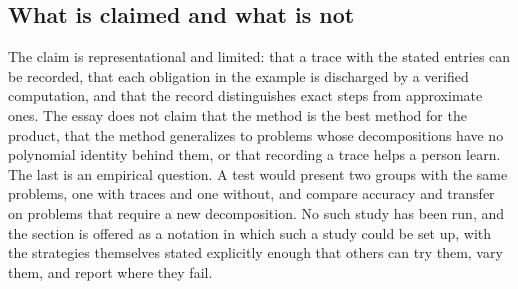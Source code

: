 \subsection{What is claimed and what is not}

The claim is representational and limited: that a trace with the stated entries can be recorded, that each obligation in the example is discharged by a verified computation, and that the record distinguishes exact steps from approximate ones. The essay does not claim that the method is the best method for the product, that the method generalizes to problems whose decompositions have no polynomial identity behind them, or that recording a trace helps a person learn. The last is an empirical question. A test would present two groups with the same problems, one with traces and one without, and compare accuracy and transfer on problems that require a new decomposition. No such study has been run, and the section is offered as a notation in which such a study could be set up, with the strategies themselves stated explicitly enough that others can try them, vary them, and report where they fail.
